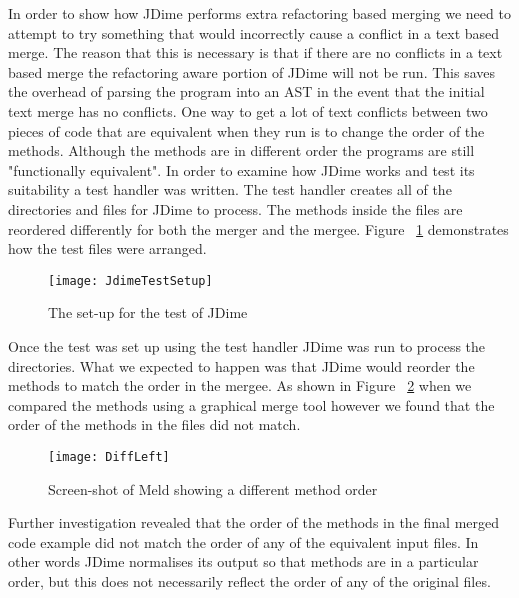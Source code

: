 In order to show how JDime performs extra refactoring based merging we need to attempt to try something that would incorrectly cause a conflict in a text based merge.  
The reason that this is necessary is that if there are no conflicts in a text based merge the refactoring aware portion of JDime will not be run.  
This saves the overhead of parsing the program into an AST in the event that the initial text merge has no conflicts. 
One way to get a lot of text conflicts between two pieces of code that are equivalent when they run is to change the order of the methods.
Although the methods are in different order the programs are still "functionally equivalent".
In order to examine how JDime works and test its suitability a test handler was written.
The test handler creates all of the directories and files for JDime to process.
The methods inside the files are reordered differently for both the merger and the mergee.
Figure ~\ref{fig:bgJDimeTest} demonstrates how the test files were arranged.


\begin{figure}[!t]
\begin{center}
\texttt{[image: JdimeTestSetup]}
\end{center}
 \label{fig:bgJDimeTest}
 \caption{The set-up for the test of JDime}
\end{figure}

Once the test was set up using the test handler JDime was run to process the directories.
What we expected to happen was that JDime would reorder the methods to match the order in the mergee. 
As shown in Figure ~\ref{fig:bgJDimeScreenShot} when we compared the methods using a graphical merge tool however we found that the order of the methods in the files did not match.

\begin{figure}[!t]
\begin{center}
\texttt{[image: DiffLeft]}
\end{center}
 \label{fig:bgJDimeScreenShot}
 \caption{Screen-shot of Meld showing a different method order}
\end{figure}


Further investigation revealed that the order of the methods in the final merged code example did not match the order of any of the equivalent input files.    
In other words JDime normalises its output so that methods are in a particular order, but this does not necessarily reflect the order of any of the original files.


